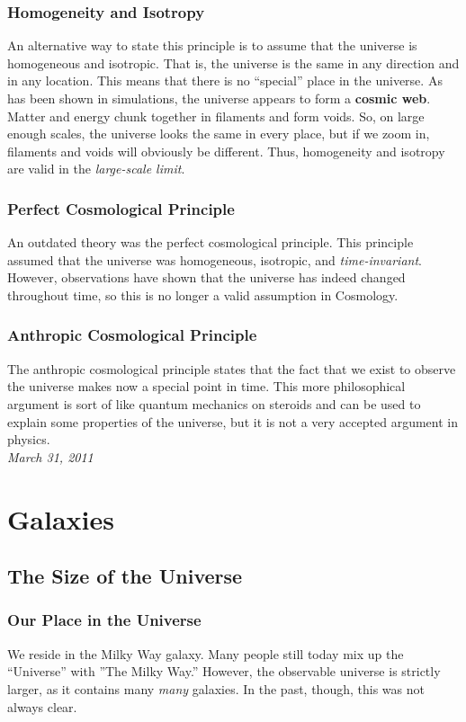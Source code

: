 \documentclass{article}
\begin{document}
	\subsubsection{Homogeneity and Isotropy}
	An alternative way to state this principle is to assume that the universe is homogeneous and isotropic. That is, the universe is the same in any direction and in any location. This means that there is no ``special'' place in the universe. As has been shown in simulations, the universe appears to form a \textbf{cosmic web}. Matter and energy chunk together in filaments and form voids. So, on large enough scales, the universe looks the same in every place, but if we zoom in, filaments and voids will obviously be different. Thus, homogeneity and isotropy are valid in the \emph{large-scale limit}.
	\subsubsection{Perfect Cosmological Principle} An outdated theory was the perfect cosmological principle. This principle assumed that the universe was homogeneous, isotropic, and \emph{time-invariant}. However, observations have shown that the universe has indeed changed throughout time, so this is no longer a valid assumption in Cosmology.
	\subsubsection{Anthropic Cosmological Principle} The anthropic cosmological principle states that the fact that we exist to observe the universe makes now a special point in time. This more philosophical argument is sort of like quantum mechanics on steroids and can be used to explain some properties of the universe, but it is not a very accepted argument in physics.\\
	
	\noindent\textit{March 31, 2011}
	\section{Galaxies}
	\subsection{The Size of the Universe}
	\subsubsection{Our Place in the Universe} We reside in the Milky Way galaxy. Many people still today mix up the ``Universe'' with ''The Milky Way.'' However, the observable universe is strictly larger, as it contains many \emph{many} galaxies. In the past, though, this was not always clear.
\end{document}

